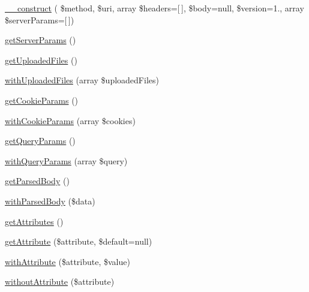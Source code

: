 \begin{DoxyCompactItemize}
\item 
\hyperlink{classGuzzleHttp_1_1Psr7_1_1ServerRequest_a0c9bdff71ee836cda8126b974b182901}{\+\_\+\+\_\+construct} ( \$method, \$uri, array \$headers=\mbox{[}$\,$\mbox{]}, \$body=null, \$version=\textquotesingle{}1.\textquotesingle{}, array \$server\+Params=\mbox{[}$\,$\mbox{]})
\item 
\hyperlink{classGuzzleHttp_1_1Psr7_1_1ServerRequest_a3c3cfb1da1fa12c52fec0c5f8549c4fb}{get\+Server\+Params} ()
\item 
\hyperlink{classGuzzleHttp_1_1Psr7_1_1ServerRequest_ae76d19f748d553ee3aa8ec1c719d1efe}{get\+Uploaded\+Files} ()
\item 
\hyperlink{classGuzzleHttp_1_1Psr7_1_1ServerRequest_ab2b182e14a422594ddc00c74c6de5f25}{with\+Uploaded\+Files} (array \$uploaded\+Files)
\item 
\hyperlink{classGuzzleHttp_1_1Psr7_1_1ServerRequest_ad20159691edfb8d604ef055c52191733}{get\+Cookie\+Params} ()
\item 
\hyperlink{classGuzzleHttp_1_1Psr7_1_1ServerRequest_a76832fc981394c140a13fe50c024fcd5}{with\+Cookie\+Params} (array \$cookies)
\item 
\hyperlink{classGuzzleHttp_1_1Psr7_1_1ServerRequest_ad516a9f552dedb6d4e92cbfe81269ec0}{get\+Query\+Params} ()
\item 
\hyperlink{classGuzzleHttp_1_1Psr7_1_1ServerRequest_aba139e3a3df11236f0ee70c1571dbf4a}{with\+Query\+Params} (array \$query)
\item 
\hyperlink{classGuzzleHttp_1_1Psr7_1_1ServerRequest_a1ba7206b9235bef8c1c615bcb6528aa6}{get\+Parsed\+Body} ()
\item 
\hyperlink{classGuzzleHttp_1_1Psr7_1_1ServerRequest_a7213bb1e535098e50d40f614f085d3fc}{with\+Parsed\+Body} (\$data)
\item 
\hyperlink{classGuzzleHttp_1_1Psr7_1_1ServerRequest_a0c55ac2643aa033868e1780ffa5456a7}{get\+Attributes} ()
\item 
\hyperlink{classGuzzleHttp_1_1Psr7_1_1ServerRequest_a92cc29d8e646a36435d09488e82c2ed9}{get\+Attribute} (\$attribute, \$default=null)
\item 
\hyperlink{classGuzzleHttp_1_1Psr7_1_1ServerRequest_a64a08accffbb9355e68df2bb1af4a654}{with\+Attribute} (\$attribute, \$value)
\item 
\hyperlink{classGuzzleHttp_1_1Psr7_1_1ServerRequest_ab1833188a1d67566219f083a6bb33cdf}{without\+Attribute} (\$attribute)
\end{DoxyCompactItemize}
